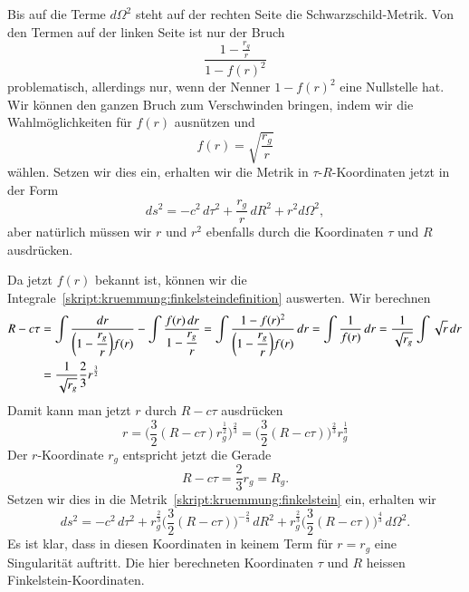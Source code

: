 Bis auf die Terme $d\Omega^2$ steht auf der rechten Seite die
Schwarzschild-Metrik.
Von den Termen auf der linken Seite ist nur der Bruch
\[
\frac{\displaystyle 1-\frac{r_g}{r}}{1-f(r)^2}
\]
problematisch, allerdings nur, wenn der Nenner $1-f(r)^2$ eine
Nullstelle hat.
Wir können den ganzen Bruch zum Verschwinden bringen, indem wir die
Wahlmöglichkeiten für $f(r)$ ausnützen und 
\[
f(r)=\sqrt{\frac{r_g}{r}}
\]
wählen.
Setzen wir dies ein, erhalten wir die Metrik in $\tau$-$R$-Koordinaten
jetzt in der Form
\begin{equation}
ds^2
=
-c^2\,d\tau^2 + \frac{r_g}{r}\,dR^2 + r^2 d\Omega^2,
\label{skript:kruemmung:finkelstein}
\end{equation}
aber natürlich müssen wir $r$ und $r^2$ ebenfalls durch die Koordinaten
$\tau$ und $R$ ausdrücken.

Da jetzt $f(r)$ bekannt ist, können wir die
Integrale~\eqref{skript:kruemmung:finkelsteindefinition} auswerten.
Wir berechnen
\begin{align*}
R-c\tau
&=
\int\frac{dr}{\displaystyle \biggl(1-\frac{r_g}{r}\biggr)f(r)}
- \int\frac{f(r)\,dr}{\displaystyle 1-\frac{r_g}{r}}
=
\int\frac{1-f(r)^2}{\displaystyle\biggl(1-\frac{r_g}{r}\biggr) f(r)}\,dr
=
\int\frac{1}{f(r)}\,dr
=
\frac{1}{\sqrt{\mathstrut r_g}}\int\sqrt{\mathstrut r}\,dr
\\
&=
\frac{1}{\sqrt{\mathstrut r_g}} \frac{2}{3}r^{\frac{3}{2}}
\end{align*}
Damit kann man jetzt $r$ durch $R-c\tau$ ausdrücken
\begin{equation}
r
=
\biggl(\frac{3}{2}(R-c\tau)r_g^{\frac{1}{2}}\biggr)^{\frac23}
=
\biggl(\frac{3}{2}(R-c\tau)\biggr)^{\frac23} r_g^{\frac13}
\label{skript:kruemmung:finkelsteinr}
\end{equation}
Der $r$-Koordinate $r_g$ entspricht jetzt die Gerade
\[
R-c\tau = \frac23 r_g = R_g.
\]
Setzen wir dies in die Metrik~\eqref{skript:kruemmung:finkelstein}
ein, erhalten wir
\[
ds^2
=
-c^2 \,d\tau^2
+r_g^{\frac23}\biggl(\frac32(R-c\tau)\biggr)^{-\frac23}\,dR^2
+ r_g^{\frac23}\biggl(\frac32(R-c\tau)\biggr)^{\frac43}\,d\Omega^2.
\]
Es ist klar, dass in diesen Koordinaten in keinem Term für $r=r_g$
eine Singularität auftritt.
Die hier berechneten Koordinaten $\tau$ und $R$ heissen
Finkelstein-Koordinaten.

